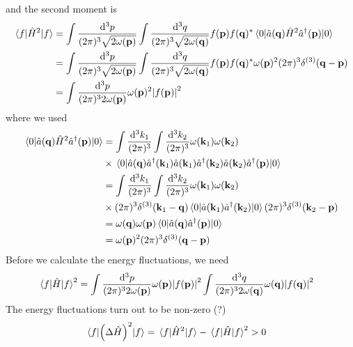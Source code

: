 and the second moment is
\begin{equation}
	\begin{split}
		\expval{\hat{H}^2}{f}
		&=
		\int\frac{\dd[3]{p}}{(2\pi)^3\sqrt{2\omega(\vb{p})}}
		\int\frac{\dd[3]{q}}{(2\pi)^3\sqrt{2\omega(\vb{q})}}
		f(\vb{p})f(\vb{q})^*
		\expval{\hat{a}(\vb{q})\hat{H}^2\hat{a}^\dagger(\vb{p})}{0}
		\\
		&=
		\int\frac{\dd[3]{p}}{(2\pi)^3\sqrt{2\omega(\vb{p})}}
		\int\frac{\dd[3]{q}}{(2\pi)^3\sqrt{2\omega(\vb{q})}}
		f(\vb{p})f(\vb{q})^*
		\omega(\vb{p})^2
		(2\pi)^3\delta^{(3)}(\vb{q}-\vb{p})
		\\
		&=
		\int\frac{\dd[3]{p}}{(2\pi)^32\omega(\vb{p})}
		\omega(\vb{p})^2
		\abs{f(\vb{p})}^2
	\end{split}
\end{equation}
where we used
\begin{equation}
	\begin{split}
		\expval{\hat{a}(\vb{q})\hat{H}^2\hat{a}^\dagger(\vb{p})}{0}
		&=
		\int\frac{\dd[3]{k_1}}{(2\pi)^3}
		\int\frac{\dd[3]{k_2}}{(2\pi)^3}
		\omega(\vb{k}_1)\omega(\vb{k}_2)
		\\
		&\times
		\expval{
			\hat{a}(\vb{q})
			\hat{a}^\dagger(\vb{k}_1)
			\hat{a}(\vb{k}_1)
			\hat{a}^\dagger(\vb{k}_2)
			\hat{a}(\vb{k}_2)
			\hat{a}^\dagger(\vb{p})
		}{0}
		\\
		&=
		\int\frac{\dd[3]{k_1}}{(2\pi)^3}
		\int\frac{\dd[3]{k_2}}{(2\pi)^3}
		\omega(\vb{k}_1)\omega(\vb{k}_2)
		\\
		&\times
		(2\pi)^3\delta^{(3)}(\vb{k}_1-\vb{q})
		\expval{
			\hat{a}(\vb{k}_1)
			\hat{a}^\dagger(\vb{k}_2)
		}{0}
		(2\pi)^3\delta^{(3)}(\vb{k}_2-\vb{p})
		\\
		&=
		\omega(\vb{q})\omega(\vb{p})
		\expval{
			\hat{a}(\vb{q})
			\hat{a}^\dagger(\vb{p})
		}{0}
		\\
		&=
		\omega(\vb{p})^2
		(2\pi)^3\delta^{(3)}(\vb{q}-\vb{p})
	\end{split}
\end{equation}
Before we calculate the energy fluctuations, we need
\begin{equation}
	\begin{split}
		\expval{\hat{H}}{f}^2
		&=
		\int\frac{\dd[3]{p}}{(2\pi)^32\omega(\vb{p})}
		\omega(\vb{p})
		\abs{f(\vb{p})}^2
		\int\frac{\dd[3]{q}}{(2\pi)^32\omega(\vb{q})}
		\omega(\vb{q})
		\abs{f(\vb{q})}^2
	\end{split}	
\end{equation}
The energy fluctuations turn out to be non-zero (?)
\begin{equation}
	\begin{split}
		\expval{\left(\Delta\hat{H}\right)^2}{f}
		&=
		\expval{\hat{H}^2}{f}
		-
		\expval{\hat{H}}{f}^2
		>
		0
	\end{split}
\end{equation}

